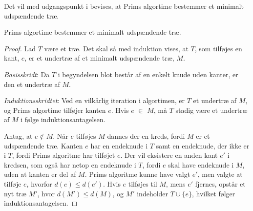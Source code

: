 Det vil med udgangspunkt i \cite{prim} bevises, at Prims algortime bestemmer et minimalt udspændende træ.

\begin{thm}
Prims algortime bestemmer et minimalt udspændende træ. 
\label{set_prim}
\end{thm}






\begin{proof}
Lad $T$ være et træ. Det skal så med induktion vises, at $T$, som tilføjes en kant, $e$, er et undertræ af et minimalt udspændende træ, $M$. 

\textit{Basisskridt}: Da $T$ i begyndelsen blot består af en enkelt knude uden kanter, er den et undertræ af $M$.

\textit{Induktionsskridtet}: Ved en vilkårlig iteration i algortimen, er $T$ et undertræ af $M$, og Prims algortime tilføjer kanten $e$. Hvis $e$ $\in$ $M$, må $T$ stadig være et undertræ af $M$ i følge induktionsantagelsen.

Antag, at $e \notin M$. Når $e$ tilføjes $M$ dannes der en kreds, fordi $M$ er et udspændende træ.
Kanten $e$ har en endeknude i $T$ samt en endeknude, der ikke er i $T$, fordi Prims algoritme har tilføjet $e$. 
Der vil eksistere en anden kant $e'$ i kredsen, som også har netop en endeknude i $T$, fordi $e$ skal have endeknude i $M$, uden at kanten er del af $M$. 
Prims algoritme kunne have valgt $e'$, men valgte at tilføje $e$, hvorfor $d(e) \leq d(e')$. 
Hvis $e$ tilføjes til $M$, mens $e'$ fjernes, opstår et nyt træ $M'$, hvor 
$d(M') \leq d(M)$, og $M'$ indeholder $T\cup \lbrace e \rbrace$, hvilket følger induktionsantagelsen. 
\end{proof}

